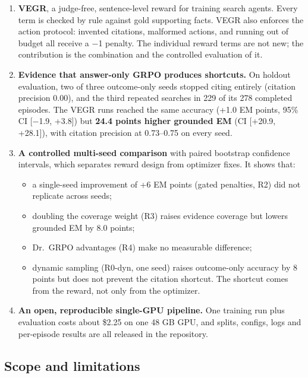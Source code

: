 \begin{enumerate}
\def\labelenumi{\arabic{enumi}.}
\tightlist
\item
  \textbf{VEGR}, a judge-free, sentence-level reward for training search
  agents. Every term is checked by rule against gold supporting facts.
  VEGR also enforces the action protocol: invented citations, malformed
  actions, and running out of budget all receive a −1 penalty. The
  individual reward terms are not new; the contribution is the
  combination and the controlled evaluation of it.
\item
  \textbf{Evidence that answer-only GRPO produces shortcuts.} On holdout
  evaluation, two of three outcome-only seeds stopped citing entirely
  (citation precision 0.00), and the third repeated searches in 229 of
  its 278 completed episodes. The VEGR runs reached the same accuracy
  (+1.0 EM points, 95\% CI {[}−1.9, +3.8{]}) but \textbf{24.4 points
  higher grounded EM} (CI {[}+20.9, +28.1{]}), with citation precision
  at 0.73--0.75 on every seed.
\item
  \textbf{A controlled multi-seed comparison} with paired bootstrap
  confidence intervals, which separates reward design from optimizer
  fixes. It shows that:

  \begin{itemize}
  \tightlist
  \item
    a single-seed improvement of +6 EM points (gated penalties, R2) did
    not replicate across seeds;
  \item
    doubling the coverage weight (R3) raises evidence coverage but
    lowers grounded EM by 8.0 points;
  \item
    Dr.~GRPO advantages (R4) make no measurable difference;
  \item
    dynamic sampling (R0-dyn, one seed) raises outcome-only accuracy by
    8 points but does not prevent the citation shortcut. The shortcut
    comes from the reward, not only from the optimizer.
  \end{itemize}
\item
  \textbf{An open, reproducible single-GPU pipeline.} One training run
  plus evaluation costs about \$2.25 on one 48 GB GPU, and splits,
  configs, logs and per-episode results are all released in the
  repository.
\end{enumerate}

\subsection{Scope and limitations}\label{sec:1.6}

